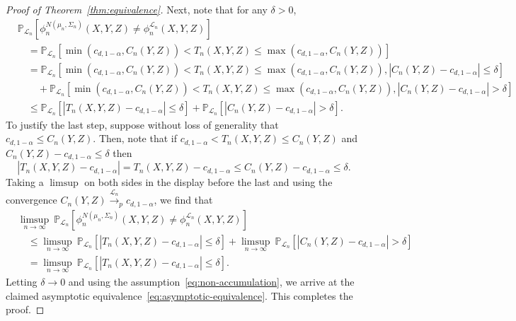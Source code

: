 \documentclass[12pt]{article}
\theoremstyle{definition}
\theoremstyle{remark}
\newcommand{\srx}{X}
\newcommand{\srz}{Z}
\newcommand{\sry}{Y}
\begin{document}
\begin{proof}[Proof of Theorem~\ref{thm:equivalence}]
	Next, note that for any $\delta > 0$,
	\small
	\begin{equation*}
		\begin{split}
			&\mathbb P_{\mathcal L_n}[\phi^{N(\mu_n, \Sigma_n)}_n(\srx, \sry, \srz) \neq \phi^{\mathcal L_n}_n(\srx, \sry, \srz)] \\
			&\quad = \mathbb P_{\mathcal L_n}[\min(c_{d,1-\alpha},C_n(\sry, \srz))  < T_n(\srx, \sry, \srz) \leq \max(c_{d,1-\alpha},C_n(\sry, \srz))] \\
			&\quad=\mathbb P_{\mathcal L_n}[\min(c_{d,1-\alpha},C_n(\sry, \srz))  < T_n(\srx, \sry, \srz) \leq \max(c_{d,1-\alpha},C_n(\sry, \srz)), |C_n(\sry, \srz)-c_{d,1-\alpha}| \leq \delta] \\
			&\quad \quad +  \mathbb P_{\mathcal L_n}[\min(c_{d,1-\alpha},C_n(\sry, \srz))  < T_n(\srx, \sry, \srz) \leq \max(c_{d,1-\alpha},C_n(\sry, \srz)), |C_n(\sry, \srz)-c_{d,1-\alpha}| > \delta]\\
			&\quad\leq \mathbb P_{\mathcal L_n}[|T_n(\srx, \sry, \srz)-c_{d,1-\alpha}| \leq \delta] + \mathbb P_{\mathcal L_n}[|C_n(\sry, \srz)-c_{d,1-\alpha}| > \delta].
		\end{split}
	\end{equation*}
	\normalsize
	To justify the last step, suppose without loss of generality that $c_{d,1-\alpha} \leq C_n(\sry, \srz)$. Then, note that if $c_{d,1-\alpha} < T_n(\srx, \sry, \srz) \leq C_n(\sry, \srz)$ and $C_n(\sry, \srz)-c_{d,1-\alpha} \leq \delta$ then
	\begin{equation*}
		|T_n(\srx, \sry,\srz)-c_{d,1-\alpha}| = T_n(\srx, \sry,\srz)-c_{d,1-\alpha} \leq C_n(\sry, \srz)- c_{d,1-\alpha} \leq \delta.
	\end{equation*}
	Taking a $\limsup$ on both sides in the display before the last and using the convergence $C_n(\sry,\srz)  \overset{\mathcal L_n}\rightarrow_p c_{d,1-\alpha}$, we find that
	\begin{equation*}
		\begin{split}
			&\limsup_{n \rightarrow \infty}\ \mathbb P_{\mathcal L_n}[\phi^{N(\mu_n, \Sigma_n)}_n(\srx, \sry, \srz) \neq \phi^{\mathcal L_n}_n(\srx, \sry, \srz)] \\
			&\quad \leq \limsup_{n \rightarrow \infty}\ \mathbb P_{\mathcal L_n}[|T_n(\srx, \sry, \srz)-c_{d,1-\alpha}| \leq \delta]+ \limsup_{n \rightarrow \infty}\ \mathbb P_{\mathcal L_n}[|C_n(\sry, \srz)-c_{d,1-\alpha}| > \delta] \\
			&\quad = \limsup_{n \rightarrow \infty}\ \mathbb P_{\mathcal L_n}[|T_n(\srx, \sry, \srz)-c_{d,1-\alpha}| \leq \delta].
		\end{split}
	\end{equation*}
	Letting $\delta \rightarrow 0$ and using the assumption~\eqref{eq:non-accumulation}, we arrive at the claimed asymptotic equivalence~\eqref{eq:asymptotic-equivalence}. This completes the proof.
\end{proof}
\end{document}
